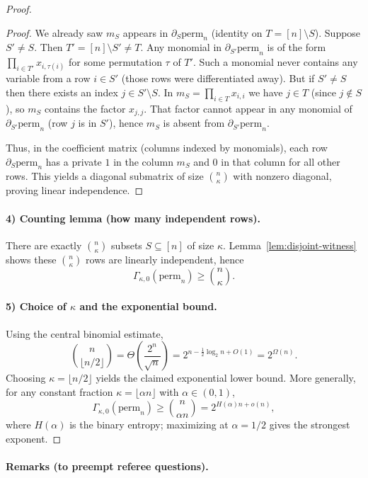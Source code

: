 \documentclass[12pt]{article}
\theoremstyle{definition}
\theoremstyle{definition}
\theoremstyle{remark}
\theoremstyle{remark}
\begin{document}
\begin{proof}
\begin{proof}
We already saw $m_S$ appears in $\partial_S \mathrm{perm}_n$ (identity on $T = [n] \setminus S$). Suppose $S' \neq S$. Then $T' = [n] \setminus S' \neq T$. Any monomial in $\partial_{S'} \mathrm{perm}_n$ is of the form $\prod_{i \in T'} x_{i,\tau(i)}$ for some permutation $\tau$ of $T'$. Such a monomial never contains any variable from a row $i \in S'$ (those rows were differentiated away). But if $S' \neq S$ then there exists an index $j \in S' \setminus S$. In $m_S = \prod_{i \in T} x_{i,i}$ we have $j \in T$ (since $j \notin S$), so $m_S$ contains the factor $x_{j,j}$. That factor cannot appear in any monomial of $\partial_{S'} \mathrm{perm}_n$ (row $j$ is in $S'$), hence $m_S$ is absent from $\partial_{S'} \mathrm{perm}_n$.

Thus, in the coefficient matrix (columns indexed by monomials), each row $\partial_S \mathrm{perm}_n$ has a private $1$ in the column $m_S$ and $0$ in that column for all other rows. This yields a diagonal submatrix of size $\binom{n}{\kappa}$ with nonzero diagonal, proving linear independence.
\end{proof}

\paragraph{4) Counting lemma (how many independent rows).}
There are exactly $\binom{n}{\kappa}$ subsets $S \subseteq [n]$ of size $\kappa$. Lemma~\ref{lem:disjoint-witness} shows these $\binom{n}{\kappa}$ rows are linearly independent, hence
\[
\Gamma_{\kappa,0}(\mathrm{perm}_n) \geq \binom{n}{\kappa}.
\]

\paragraph{5) Choice of $\kappa$ and the exponential bound.}
Using the central binomial estimate,
\[
\binom{n}{\lfloor n/2 \rfloor} = \Theta\!\left(\frac{2^n}{\sqrt{n}}\right) = 2^{n - \frac{1}{2}\log_2 n + O(1)} = 2^{\Omega(n)}.
\]
Choosing $\kappa = \lfloor n/2 \rfloor$ yields the claimed exponential lower bound. More generally, for any constant fraction $\kappa = \lfloor \alpha n \rfloor$ with $\alpha \in (0,1)$,
\[
\Gamma_{\kappa,0}(\mathrm{perm}_n) \geq \binom{n}{\alpha n} = 2^{H(\alpha)n + o(n)},
\]
where $H(\alpha)$ is the binary entropy; maximizing at $\alpha = 1/2$ gives the strongest exponent.
\end{proof}

\paragraph{Remarks (to preempt referee questions).}
\end{document}
